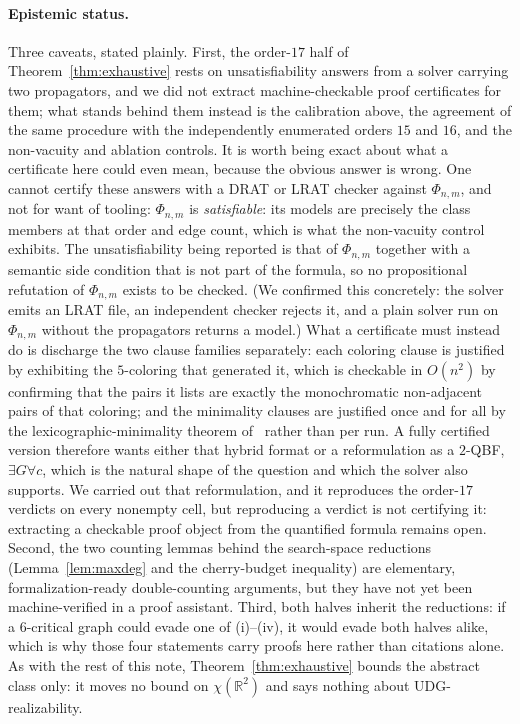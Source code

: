 \documentclass[11pt]{article}
\theoremstyle{definition}
\newcommand{\R}{\mathbb{R}}
\newcommand{\chrom}{\chi}
\begin{document}
\paragraph{Epistemic status.} Three caveats, stated plainly. First, the
order-$17$ half of Theorem~\ref{thm:exhaustive} rests on unsatisfiability
answers from a solver carrying two propagators, and we did not extract
machine-checkable proof certificates for them; what stands behind them instead is
the calibration above, the agreement of the same procedure with the independently
enumerated orders $15$ and $16$, and the non-vacuity and ablation controls. It is
worth being exact about what a certificate here could even mean, because the
obvious answer is wrong. One cannot certify these answers with a DRAT or LRAT
checker against $\Phi_{n,m}$, and not for want of tooling: $\Phi_{n,m}$ is
\emph{satisfiable}: its models are precisely the class members at that order and
edge count, which is what the non-vacuity control exhibits. The unsatisfiability
being reported is that of $\Phi_{n,m}$ together with a semantic side condition
that is not part of the formula, so no propositional refutation of $\Phi_{n,m}$
exists to be checked. (We confirmed this concretely: the solver emits an LRAT file,
an independent checker rejects it, and a plain solver run on $\Phi_{n,m}$ without
the propagators returns a model.) What a certificate must instead do is discharge
the two clause families separately: each coloring clause is justified by exhibiting
the $5$-coloring that generated it, which is checkable in $O(n^2)$ by confirming
that the pairs it lists are exactly the monochromatic non-adjacent pairs of that
coloring; and the minimality clauses are justified once and for all by the
lexicographic-minimality theorem of~\cite{KirchwegerSzeider2021} rather than per
run. A fully certified version therefore wants either that hybrid format or a
reformulation as a $2$-QBF, $\exists G \forall c$, which is the natural shape of
the question and which the solver also supports. We carried out that
reformulation, and it reproduces the order-$17$ verdicts on every nonempty cell,
but reproducing a verdict is not certifying it: extracting a checkable proof
object from the quantified formula remains open. Second, the two counting lemmas
behind the search-space reductions (Lemma~\ref{lem:maxdeg} and the
cherry-budget inequality) are elementary, formalization-ready double-counting
arguments, but they have not yet been machine-verified in a proof assistant.
Third, both halves inherit the reductions: if a $6$-critical graph could evade
one of (i)--(iv), it would evade both halves alike, which is why those four
statements carry proofs here rather than citations alone.
As with the rest of this note, Theorem~\ref{thm:exhaustive} bounds the
abstract class only: it moves no bound on $\chrom(\R^2)$ and says nothing
about UDG-realizability.
\end{document}
